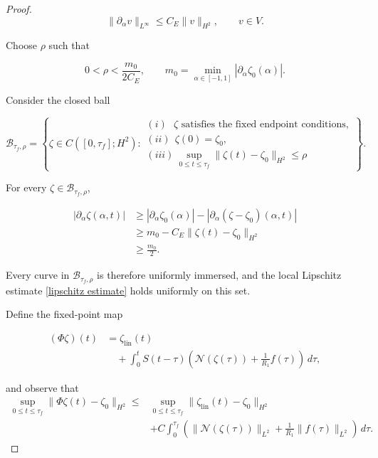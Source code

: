 \documentclass[10pt,a4paper]{amsart}
\begin{document}
\begin{proof}
$$
    \|\partial_\alpha v\|_{L^\infty}
    \leq C_E\|v\|_{H^2},
    \qquad v\in V.
$$

Choose $\rho$ such that

$$
    0<\rho<\frac{m_0}{2C_E},
    \qquad
    m_0=
    \min_{\alpha\in[-1,1]}
    |\partial_\alpha\zeta_0(\alpha)|.
$$

Consider the closed ball

$$
    \mathcal B_{\tau_f,\rho}
    =
    \left\{
        \zeta\in C([0,\tau_f];H^2):
        \begin{array}{l}
        (i) \ \ \ \zeta\text{ satisfies the fixed endpoint conditions},\\[1mm]
        (ii)\ \ \zeta(0)=\zeta_0,\\[1mm]
        (iii)\ \displaystyle
        \sup_{0\leq t\leq \tau_f}
        \|\zeta(t)-\zeta_0\|_{H^2}\leq\rho
        \end{array}
    \right\}.
$$

For every \(\zeta\in\mathcal B_{\tau_f,\rho}\),

$$
\begin{aligned}
    |\partial_\alpha\zeta(\alpha,t)|
    &\geq
    |\partial_\alpha\zeta_0(\alpha)|
    -
    |\partial_\alpha(\zeta-\zeta_0)(\alpha,t)|\\
    &\geq
    m_0-C_E\|\zeta(t)-\zeta_0\|_{H^2}\\
    &\geq\frac{m_0}{2}.
\end{aligned}
$$

Every curve in \(\mathcal B_{\tau_f,\rho}\) is therefore uniformly immersed, and the local Lipschitz estimate
\eqref{lipschitz estimate} holds uniformly on this set.
\newline

Define the fixed-point map

$$
\begin{aligned}
    (\Phi\zeta)(t)
    &=
    \zeta_{\mathrm{lin}}(t)\\
    &\quad+
    \int_0^t
    S(t-\tau)
    \left(
        \mathcal N(\zeta(\tau))
        +\frac{1}{R_1}f(\tau)
    \right)\,d\tau,
\end{aligned}
$$

and observe that 
\begin{equation}
\begin{aligned}
    \sup_{0\leq t\leq \tau_f}
    \|\Phi\zeta(t)-\zeta_0\|_{H^2}
    \leq{}&
    \sup_{0\leq t\leq \tau_f}
    \|\zeta_{\mathrm{lin}}(t)-\zeta_0\|_{H^2}\\
    &+
    C\int_0^{\tau_f}
    \left(
        \|\mathcal N(\zeta(\tau))\|_{L^2}
        +\frac{1}{R_1}\|f(\tau)\|_{L^2}
    \right)\,d\tau.
    \label{fixed point estimate}
\end{aligned}
\end{equation}


\end{proof}
\end{document}
